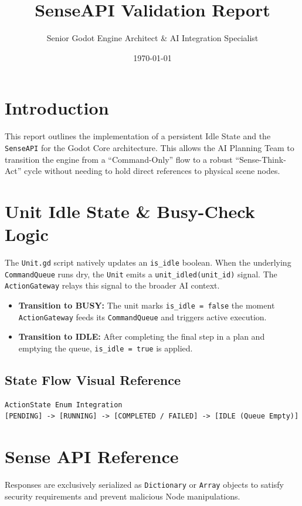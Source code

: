 \documentclass[12pt]{article}
\title{SenseAPI Validation Report}
\author{Senior Godot Engine Architect & AI Integration Specialist}
\date{\today}
\begin{document}
\maketitle

\section{Introduction}
This report outlines the implementation of a persistent Idle State and the \texttt{SenseAPI} for the Godot Core architecture. This allows the AI Planning Team to transition the engine from a ``Command-Only'' flow to a robust ``Sense-Think-Act'' cycle without needing to hold direct references to physical scene nodes.

\section{Unit Idle State \& Busy-Check Logic}
The \texttt{Unit.gd} script natively updates an \texttt{is\_idle} boolean. When the underlying \texttt{CommandQueue} runs dry, the \texttt{Unit} emits a \texttt{unit\_idled(unit\_id)} signal. The \texttt{ActionGateway} relays this signal to the broader AI context.
\begin{itemize}
    \item \textbf{Transition to BUSY:} The unit marks \texttt{is\_idle = false} the moment \texttt{ActionGateway} feeds its \texttt{CommandQueue} and triggers active execution.
    \item \textbf{Transition to IDLE:} After completing the final step in a plan and emptying the queue, \texttt{is\_idle = true} is applied.
\end{itemize}

\subsection{State Flow Visual Reference}
\begin{verbatim}
ActionState Enum Integration
[PENDING] -> [RUNNING] -> [COMPLETED / FAILED] -> [IDLE (Queue Empty)]
\end{verbatim}

\section{Sense API Reference}
Responses are exclusively serialized as \texttt{Dictionary} or \texttt{Array} objects to satisfy security requirements and prevent malicious Node manipulations.
\end{document}
